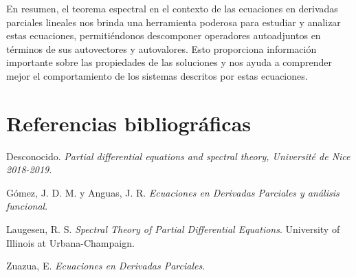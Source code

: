 \documentclass{article}
\begin{document}
En resumen, el teorema espectral en el contexto de las ecuaciones en derivadas parciales lineales nos brinda una herramienta poderosa para estudiar y analizar estas ecuaciones, permitiéndonos descomponer operadores autoadjuntos en términos de sus autovectores y autovalores. Esto proporciona información importante sobre las propiedades de las soluciones y nos ayuda a comprender mejor el comportamiento de los sistemas descritos por estas ecuaciones.



\newpage

\section{Referencias bibliográficas}

\renewcommand{\refname}{}
\begin{thebibliography}{9}

    Desconocido. \emph{Partial differential equations and spectral theory, Université de Nice 2018-2019}.
    
    Gómez, J. D. M. y Anguas, J. R. \emph{Ecuaciones en Derivadas Parciales y análisis funcional}.
    
    Laugesen, R. S. \emph{Spectral Theory of Partial Differential Equations}. University of Illinois at Urbana-Champaign.
    
    Zuazua, E. \emph{Ecuaciones en Derivadas Parciales}.
    
    \end{thebibliography}
\end{document}
